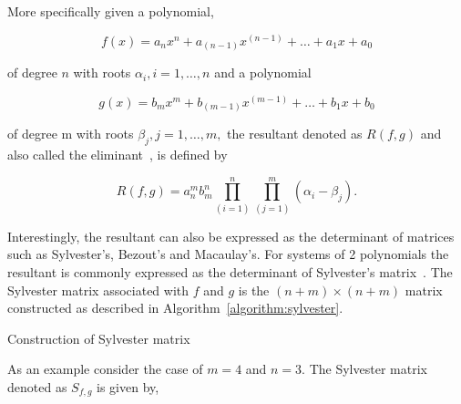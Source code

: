 More specifically given a polynomial,

\[ f(x) = a_n x^n + a_{(n-1)} x ^{(n-1)} + \dots +a_1 x + a_0 \]

of degree \(n\) with roots \(\alpha_i, i=1, \dots, n\) and a polynomial

\[ g(x) = b_m x ^m + b_{(m-1)} x^{(m-1)} + \dots + b_1 x + b_0 \]

of degree m with roots \(\beta_j, j=1, \dots , m,\) the resultant denoted as \(R(f, g)\)
and also called the eliminant~\cite{Salmon1924}, is defined by

\begin{equation}\label{eq:resultant_definition}
R(f, g) = a_n^m b_m^n \prod_{(i=1)}^n \prod_{(j=1)}^m ( \alpha_i - \beta_j).
\end{equation}

Interestingly, the resultant can also be expressed as the determinant of
matrices such as Sylvester's, Bezout's and Macaulay's. For systems
of 2 polynomials the resultant is commonly expressed as the determinant of 
Sylvester's matrix~\cite{Akritas2014}. The Sylvester matrix associated with
\(f\) and \(g\) is the \((n + m) \times (n + m)\) matrix constructed as
described in Algorithm~\ref{algorithm:sylvester}.

\begin{algorithm}[H]
\caption{Construction of Sylvester matrix~\cite{Akritas2014}}\label{algorithm:sylvester}
\end{algorithm}

As an example consider the case of \(m = 4\) and \(n = 3\). The Sylvester matrix
denoted as \(S_{f,g}\) is given by,

